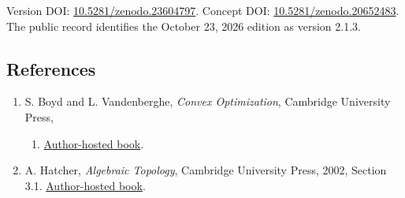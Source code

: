 \documentclass[
]{article}
\providecommand{\tightlist}{%
  \setlength{\itemsep}{0pt}\setlength{\parskip}{0pt}}
\begin{document}
Version DOI:
\href{https://doi.org/10.5281/zenodo.23604797}{10.5281/zenodo.23604797}.
Concept DOI:
\href{https://doi.org/10.5281/zenodo.20652483}{10.5281/zenodo.20652483}.
The public record identifies the October 23, 2026 edition as version
2.1.3.

\subsection{References}\label{references}

\begin{enumerate}
\def\labelenumi{\arabic{enumi}.}
\tightlist
\item
  S. Boyd and L. Vandenberghe, \emph{Convex Optimization}, Cambridge
  University Press,

  \begin{enumerate}
  \def\labelenumii{\arabic{enumii}.}
  \setcounter{enumii}{2003}
  \tightlist
  \item
    \href{https://web.stanford.edu/~boyd/cvxbook/}{Author-hosted book}.
  \end{enumerate}
\item
  A. Hatcher, \emph{Algebraic Topology}, Cambridge University Press,
  2002, Section 3.1.
  \href{https://pi.math.cornell.edu/~hatcher/AT/ATpage.html}{Author-hosted
  book}.
\end{enumerate}
\end{document}
